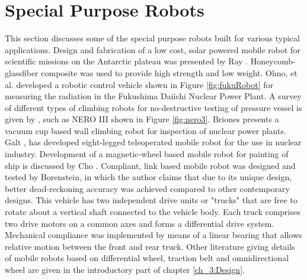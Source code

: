 \section{ Special Purpose Robots}
This section discusses some of the special purpose  robots built for various typical applications. 
Design and fabrication of a low cost, solar powered mobile robot for  scientific missions on the Antarctic plateau was presented by Ray  \cite{ray2005design}. Honeycomb-glassfiber composite was used to provide high strength and low weight. Ohno, et al. \cite{ohno2011robotic}   developed a robotic control vehicle shown in Figure \ref{fig:fukuRobot} for measuring the radiation in the Fukushima Daiichi Nuclear Power Plant. A survey of different types of climbing robots for no-destructive testing of pressure vessel is given by \cite{luk2006tele}, such as NERO III shown in Figure \ref{fig:nero3}.  Briones \cite{briones1994wall} presents a vacuum cup based wall climbing robot for inspection of  nuclear power plants. Galt \cite{galt1997tele}, has developed eight-legged teleoperated mobile robot for the use in nuclear industry. Development of a magnetic-wheel based mobile robot for painting of ship is discussed by Cho \cite{cho2013study}. Compliant, link based mobile robot was designed and tested by Borenstein\cite{borenstein1995control}, in which the author claims that due to its unique design, better dead-reckoning accuracy was achieved compared to other contemporary designs. This vehicle has two independent drive units or "trucks" that are free to rotate about a vertical shaft connected to the vehicle body. Each truck comprises two drive motors on a common axes and forms a differential drive system. Mechanical compliance was implemented by means of a linear bearing that allows relative motion between the front and rear truck. Other literature giving details of  mobile robots based on   differential wheel, traction belt and omnidirectional wheel are given in the introductory part of chapter \ref{ch_3:Design}.

